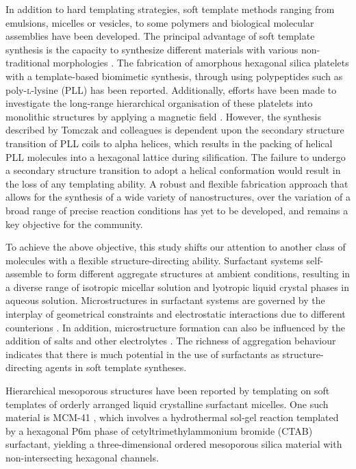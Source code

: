 \documentclass[a4paper,12pt,twocolumn]{article}
\begin{document}
In addition to hard templating strategies, soft template methods ranging from emulsions, micelles or vesicles, to some polymers and biological molecular assemblies have been developed. The principal advantage of soft template synthesis is the capacity to synthesize different materials with various non-traditional morphologies \cite{wan2007}. The fabrication of amorphous hexagonal silica platelets with a template-based biomimetic synthesis, through using polypeptides such as poly-\textsc{l}-lysine (PLL) \cite{tomczak2005} has been reported. Additionally, efforts have been made to investigate the long-range hierarchical organisation of these platelets into monolithic structures by applying a magnetic field \cite{bellomo2006}. However, the synthesis described by Tomczak and colleagues is dependent upon the secondary structure transition of PLL coils to alpha helices, which results in the packing of helical PLL molecules into a hexagonal lattice during silification. The failure to undergo a secondary structure transition to adopt a helical conformation would result in the loss of any templating ability. A robust and flexible fabrication approach that allows for the synthesis of a wide variety of nanostructures, over the variation of a broad range of precise reaction conditions has yet to be developed, and remains a key objective for the community.

To achieve the above objective, this study shifts our attention to another class of molecules with a flexible structure-directing ability. Surfactant systems self-assemble to form different aggregate structures at ambient conditions, resulting in a diverse range of isotropic micellar solution and lyotropic liquid crystal phases in aqueous solution. Microstructures in surfactant systems are governed by the interplay of geometrical constraints \cite{israelachvili1976} and electrostatic interactions due to different counterions \cite{kang1993}. In addition, microstructure formation can also be influenced by the addition of salts and other electrolytes \cite{thalberg1991}. The richness of aggregation behaviour indicates that there is much potential in the use of surfactants as structure-directing agents in soft template syntheses. 

Hierarchical mesoporous structures have been reported by templating on soft templates of orderly arranged liquid crystalline surfactant micelles. One such material is MCM-41 \cite{kresge1992}, which involves a hydrothermal sol-gel reaction templated by a hexagonal P6m phase of cetyltrimethylammonium bromide (CTAB) surfactant, yielding a three-dimensional ordered mesoporous silica material with non-intersecting hexagonal channels. 
\end{document}
